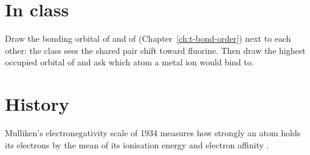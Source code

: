 \section{In class}
Draw the bonding orbital of  and of  (Chapter~\ref{ch:t-bond-order}) next to each other: the class sees the shared pair shift toward fluorine. Then draw the highest occupied orbital of  and ask which atom a metal ion would bind to.

\section{History}
Mulliken's electronegativity scale of 1934 measures how strongly an atom holds its electrons by the mean of its ionisation energy and electron affinity \cite{mulliken1934}.
